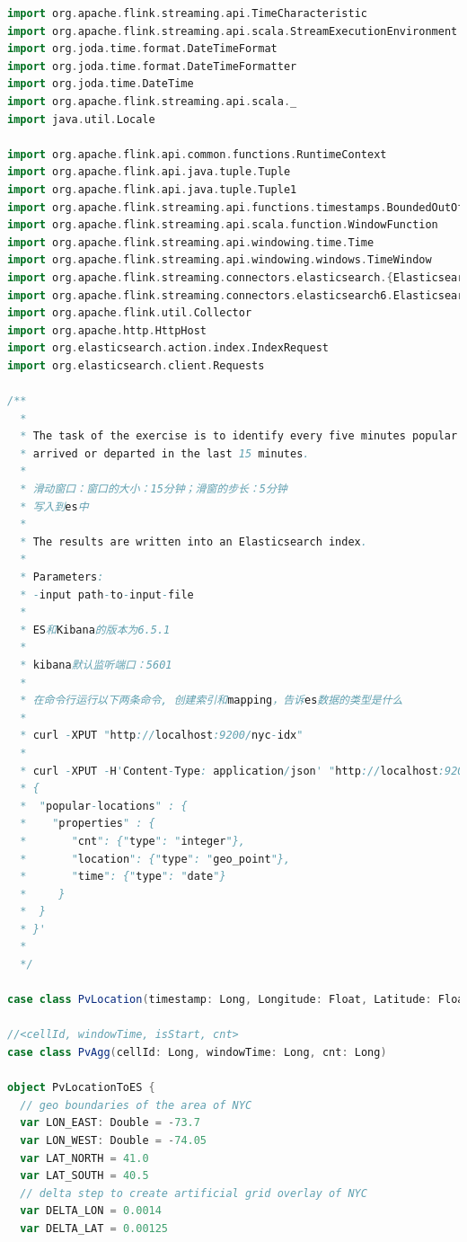\documentclass[oneside]{ctexbook}
\begin{document}
\begin{lstlisting}[language=scala]
import org.apache.flink.streaming.api.TimeCharacteristic
import org.apache.flink.streaming.api.scala.StreamExecutionEnvironment
import org.joda.time.format.DateTimeFormat
import org.joda.time.format.DateTimeFormatter
import org.joda.time.DateTime
import org.apache.flink.streaming.api.scala._
import java.util.Locale

import org.apache.flink.api.common.functions.RuntimeContext
import org.apache.flink.api.java.tuple.Tuple
import org.apache.flink.api.java.tuple.Tuple1
import org.apache.flink.streaming.api.functions.timestamps.BoundedOutOfOrdernessTimestampExtractor
import org.apache.flink.streaming.api.scala.function.WindowFunction
import org.apache.flink.streaming.api.windowing.time.Time
import org.apache.flink.streaming.api.windowing.windows.TimeWindow
import org.apache.flink.streaming.connectors.elasticsearch.{ElasticsearchSinkFunction, RequestIndexer}
import org.apache.flink.streaming.connectors.elasticsearch6.ElasticsearchSink
import org.apache.flink.util.Collector
import org.apache.http.HttpHost
import org.elasticsearch.action.index.IndexRequest
import org.elasticsearch.client.Requests

/**
  *
  * The task of the exercise is to identify every five minutes popular areas where many taxi rides
  * arrived or departed in the last 15 minutes.
  *
  * 滑动窗口：窗口的大小：15分钟；滑窗的步长：5分钟
  * 写入到es中
  *
  * The results are written into an Elasticsearch index.
  *
  * Parameters:
  * -input path-to-input-file
  *
  * ES和Kibana的版本为6.5.1
  *
  * kibana默认监听端口：5601
  *
  * 在命令行运行以下两条命令, 创建索引和mapping，告诉es数据的类型是什么
  *
  * curl -XPUT "http://localhost:9200/nyc-idx"
  *
  * curl -XPUT -H'Content-Type: application/json' "http://localhost:9200/nyc-idx/_mapping/popular-locations" -d'
  * {
  *  "popular-locations" : {
  *    "properties" : {
  *       "cnt": {"type": "integer"},
  *       "location": {"type": "geo_point"},
  *       "time": {"type": "date"}
  *     }
  *  }
  * }'
  *
  */

case class PvLocation(timestamp: Long, Longitude: Float, Latitude: Float)

//<cellId, windowTime, isStart, cnt>
case class PvAgg(cellId: Long, windowTime: Long, cnt: Long)

object PvLocationToES {
  // geo boundaries of the area of NYC
  var LON_EAST: Double = -73.7
  var LON_WEST: Double = -74.05
  var LAT_NORTH = 41.0
  var LAT_SOUTH = 40.5
  // delta step to create artificial grid overlay of NYC
  var DELTA_LON = 0.0014
  var DELTA_LAT = 0.00125


\end{lstlisting}
\end{document}
